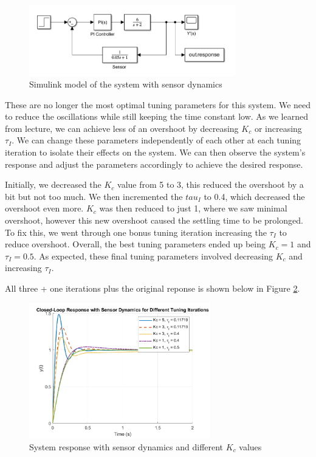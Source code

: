 \documentclass[12pt]{article}
\begin{document}
\begin{enumerate}
  \begin{figure}[H]
    \centering
    \includegraphics[width=0.8\textwidth]{Figures/Models/model1_14.png}
    \caption{Simulink model of the system with sensor dynamics}
    \label{fig:figure1_15}
  \end{figure}

  These are no longer the most optimal tuning parameters for this system. We need to reduce the oscillations while still keeping the time constant low. As we learned from lecture, we can achieve less of an overshoot by decreasing $K_c$ or increasing $\tau_I$. We can change these parameters independently of each other at each tuning iteration to isolate their effects on the system. We can then observe the system's response and adjust the parameters accordingly to achieve the desired response. \linebreak

  Initially, we decreased the $K_c$ value from 5 to 3, this reduced the overshoot by a bit but not too much. We then incremented the $tau_I$ to 0.4, which decreased the overshoot even more. $K_c$ was then reduced to just 1, where we saw minimal overshoot, however this new overshoot caused the settling time to be prolonged. To fix this, we went through one bonus tuning iteration increasing the $\tau_I$ to reduce overshoot. Overall, the best tuning parameters ended up being $K_c = 1$ and $\tau_I = 0.5$. As expected, these final tuning parameters involved decreasing $K_c$ and increasing $\tau_I$.
  
  All three + one iterations plus the original reponse is shown below in Figure \ref{fig:figure1_16}. 

  \begin{figure}[H]
    \centering
    \includegraphics[width=0.7\textwidth]{Figures/figure1_15.png}
    \caption{System response with sensor dynamics and different $K_c$ values}
    \label{fig:figure1_16}
  \end{figure}


\end{enumerate}
\end{document}
